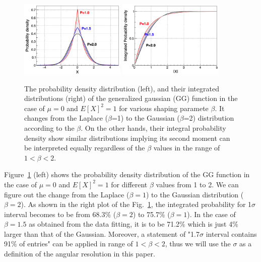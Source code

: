 \documentclass[jkps,preprint,fleqn,showpacs,showkeys]{revtex4}
\begin{document}
\begin{figure}[!hbt]
\includegraphics[width=0.45\textwidth]{figures/PDF_Gonzalez.pdf}
\includegraphics[width=0.45\textwidth]{figures/Int_Gonzalez.pdf}
\caption{ The probability density distribution (left), and their integrated distributions (right) of the generalized gaussian (GG) function in the case of  $\mu = 0$ and $E[X]^2 = 1$ for various shaping paramete $\beta$. It changes from the Laplace ($\beta$=1) to the Gaussian ($\beta$=2) distribution according to the $\beta$. On the other hands, their integral probability density show similar distributions implying its second moment can be interpreted equally regardless of the $\beta$ values in the range of $1<\beta<2$.}
\label{fig:GG_pdf}
\end{figure}

Figure~\ref{fig:GG_pdf} (left) shows the probability density distribution of the GG function in the case of $\mu = 0$ and $E[X]^2 = 1$ for different $\beta$ values from 1 to 2. We can figure out the change from the Laplace ($\beta = 1$) to the Gaussian distribution ($\beta=2$). As shown in the right plot of the Fig.~\ref{fig:GG_pdf}, the integrated probability for 1$\sigma$ interval becomes to be from 68.3$\%$ ($\beta=2$) to 75.7$\%$ ($\beta=1$). In the case of $\beta=1.5$ as obtained from the data fitting, it is to be 71.2$\%$ which is just 4$\%$ larger than that of the Gaussian. Moreover, a statement of "1.7$\sigma$ interval contains 91$\%$ of entries" can be applied in range of $1<\beta<2$, thus we will use the $\sigma$ as a definition of the angular resolution in this paper.    
\end{document}
